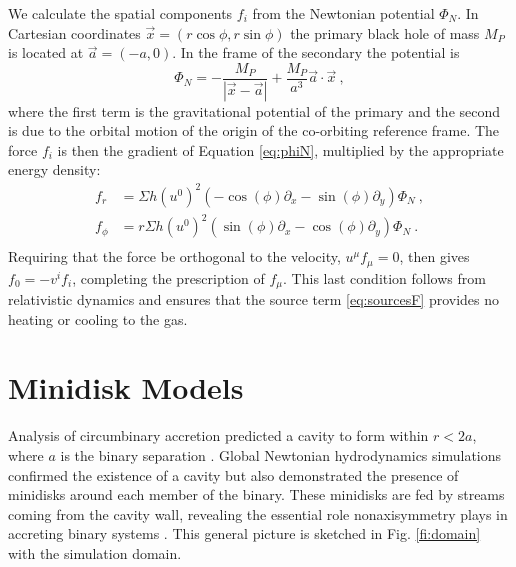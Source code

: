 \documentclass{emulateapj}
\newcommand{\Sig}{\Sigma}
\begin{document}
We calculate the spatial components $f_i$ from the Newtonian potential $\Phi_N$.  In Cartesian coordinates $\vec{x}=(r \cos \phi, r \sin \phi)$ the primary black hole of mass $M_P$ is located at $\vec a = (-a, 0)$.  In the frame of the secondary the potential is
\begin{equation}
	\Phi_N = -\frac{M_P}{|\vec{x} -  \vec{a} |} + \frac{M_P}{a^3}  \vec{a} \cdot \vec{x} \ , \label{eq:phiN}
\end{equation}
where the first term is the gravitational potential of the primary and the second is due to the orbital motion of the origin of the co-orbiting reference frame.  The force $f_i$ is then the gradient of Equation \eqref{eq:phiN}, multiplied by the appropriate energy density:
\begin{align}
	f_r &= \Sig h (u^0)^2 \left( -\cos(\phi) \partial_x  - \sin(\phi)\partial_y\right) \Phi_N \ ,\nonumber \\
	f_\phi &= r\Sig h (u^0)^2 \left( \sin(\phi) \partial_x  -\cos(\phi)\partial_y\right) \Phi_N \ .\nonumber \\
\end{align}
Requiring that the force be orthogonal to the velocity, $u^\mu f_\mu = 0$, then gives $f_0 = -v^i f_i$, completing the prescription of $f_\mu$. This last condition follows from relativistic dynamics and ensures that the source term \eqref{eq:sourcesF} provides no heating or cooling to the gas.


\section{Minidisk Models}
\label{sec:models}

Analysis of circumbinary accretion predicted a cavity to form within $r<2a$, where $a$ is the binary separation \citep{Milos05}. Global Newtonian hydrodynamics simulations confirmed the existence of a cavity but also demonstrated the presence of minidisks around each member of the binary.  These minidisks are fed by streams coming from the cavity wall, revealing the essential role nonaxisymmetry plays in accreting binary systems \citep{Farris14}.  This general picture is sketched in Fig. \ref{fi:domain} with the simulation domain.
\end{document}
